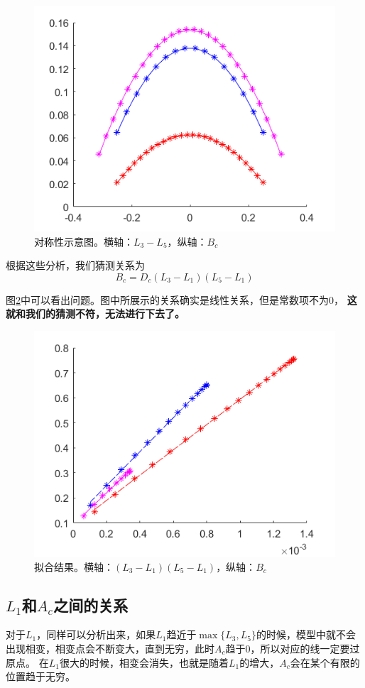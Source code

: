 \documentclass[12pt,a4paper]{article}
\begin{document}
\begin{figure}[h]
\centering
\includegraphics[width=0.4\linewidth]{n3ac}
\caption{对称性示意图。横轴：$L_3-L_5$，纵轴：$B_c$}
\label{fn30}
\end{figure}

根据这些分析，我们猜测关系为
$$ B_c = D_c (L_3 - L_1)(L_5 - L_1) $$

图\ref{fn31}中可以看出问题。图中所展示的关系确实是线性关系，但是常数项不为0，\textbf{\color{blue} 这就和我们的猜测不符，无法进行下去了。}
\begin{figure}[h]
\centering
\includegraphics[width=0.4\linewidth]{n3bc}
\caption{拟合结果。横轴：$(L_3 - L_1)(L_5 - L_1)$，纵轴：$B_c$}
\label{fn31}
\end{figure}


\subsection{$L_1$和$A_c$之间的关系}

对于$L_1$，同样可以分析出来，如果$L_1$趋近于$\max\{L_3, L_5\}$的时候，模型中就不会出现相变，相变点会不断变大，直到无穷，此时$A_c$趋于0，所以对应的线一定要过原点。
在$L_1$很大的时候，相变会消失，也就是随着$L_1$的增大，$A_c$会在某个有限的位置趋于无穷。
\end{document}
